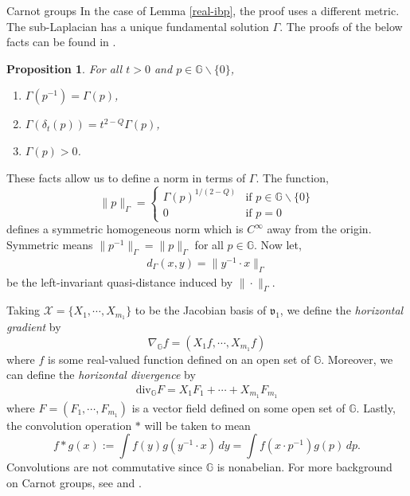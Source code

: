 \documentclass[12pt,a4paper,reqno]{amsart}
\newcommand{\cg}{\Gamma}
\newcommand{\vf}{\mathfrak{v}}
\newcommand{\G}{\mathbb{G}}
\numberwithin{equation}{section}
\newtheorem{prop}[thm]{Proposition}
\theoremstyle{definition}
\begin{document}
\begin{subsection}{Carnot groups}
In the case of Lemma \ref{real-ibp}, the proof uses a different metric. The sub-Laplacian has a unique fundamental solution $\cg$. The proofs of the below facts can be found in \cite[Section 5]{BLU}. 
\begin{prop}
For all $t > 0$ and $p \in \G \backslash \{0\}$, \begin{enumerate}
    \item[(i)] $\cg(p^{-1}) = \cg(p)$,
    \item[(ii)] $\cg(\delta_t(p))= t^{2-Q}\cg(p)$,
    \item[(iii)] $\cg(p) > 0$.
\end{enumerate} 
\end{prop}
These facts allow us to define a norm in terms of $\cg$. The function, 
\begin{equation}
\| p\|_{\cg}=
    \begin{cases}
        \cg(p)^{1/(2-Q)} & \text{if } p \in \G \backslash \{0\}\\
        0 & \text{if } p =0
    \end{cases} \label{cg-norm}
\end{equation}
defines a symmetric homogeneous norm which is $C^{\infty}$ away from the origin. Symmetric means $\| p^{-1}\|_{\cg} = \|p\|_{\cg}$ for all $p \in \G$. Now let, \begin{align}
    d_{\cg}(x,y) = \| y^{-1}\cdot x\|_{\cg} \label{cg-dist}
\end{align}
be the left-invariant quasi-distance induced by $\| \cdot \|_{\cg}$.

Taking $\mathcal{X} = \{X_1, \cdots , X_{m_1}\}$ to be the Jacobian basis of $\vf_1$, we define the \emph{horizontal gradient} by \begin{equation}\label{horiz-gradient}
    \nabla_{\G}f = (X_1f, \cdots , X_{m_1}f)
\end{equation}
where $f$ is some real-valued function defined on an open set of $\G$. Moreover, we can define the \emph{horizontal divergence} by \begin{align*}
\text{div}_{\G} F = X_1 F_1 + \cdots + X_{m_1}F_{m_1}   
\end{align*} 
where $F = (F_1, \cdots, F_{m_1})$ is a vector field defined on some open set of $\G$. Lastly, the convolution operation $\ast$ will be taken to mean \begin{equation}\label{convolution}
f \ast g(x) := \int f(y) g(y^{-1}\cdot x)\,dy = \int f(x \cdot p^{-1})g(p)\,dp.    
\end{equation} 
Convolutions are not commutative since $\G$ is nonabelian. For more background on Carnot groups, see \cite{BLU} and \cite{FR}.
\end{subsection}
\end{document}
